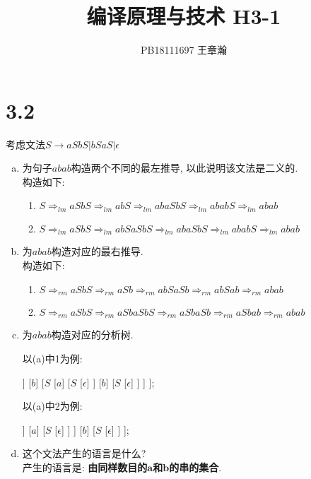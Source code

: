 \documentclass[UTF8]{article}
\title{编译原理与技术 H3-1}
\date{}
\author{PB18111697 王章瀚}
\begin{document}
\maketitle

\section*{3.2}
\noindent 考虑文法$S\rightarrow aSbS|bSaS|\epsilon$
\begin{enumerate}[(a) ]
\item 为句子$abab$构造两个不同的最左推导, 以此说明该文法是二义的.\\
	构造如下:
	\begin{enumerate}[1. ]
	\item $S \Rightarrow_{lm} aSbS \Rightarrow_{lm} abS \Rightarrow_{lm} abaSbS \Rightarrow_{lm} ababS \Rightarrow_{lm} abab$
	\item $S \Rightarrow_{lm} aSbS \Rightarrow_{lm} abSaSbS \Rightarrow_{lm} abaSbS \Rightarrow_{lm} ababS \Rightarrow_{lm} abab$
	\end{enumerate}
\item 为$abab$构造对应的最右推导.\\
	构造如下:
	\begin{enumerate}[1. ]
	\item $S \Rightarrow_{rm} aSbS \Rightarrow_{rm} aSb \Rightarrow_{rm} abSaSb \Rightarrow_{rm} abSab \Rightarrow_{rm} abab$
	\item $S \Rightarrow_{rm} aSbS \Rightarrow_{rm} aSbaSbS \Rightarrow_{rm} aSbaSb \Rightarrow_{rm} aSbab \Rightarrow_{rm} abab$
	\end{enumerate}
\item 为$abab$构造对应的分析树.\\
	\begin{minipage}{0.5\linewidth}
	以(a)中1为例:\\
	\begin{forest}
	[$S$, for tree={fill=aquamarine}
		[$a$]
		[$S$
			[$\epsilon$]
		]
		[$b$]
		[$S$
			[$a$]
			[$S$
				[$\epsilon$]
			]
			[$b$]
			[$S$
				[$\epsilon$]
			]
		]
	];
	\end{forest}
	\end{minipage}
	\begin{minipage}{0.5\linewidth}
	以(a)中2为例:\\
	\begin{forest}
	[$S$, for tree={fill=aquamarine}
		[$a$]
		[$S$
			[$b$]
			[$S$
				[$\epsilon$]
			]
			[$a$]
			[$S$
				[$\epsilon$]
			]
		]
		[$b$]
		[$S$
			[$\epsilon$]
		]
	];
	\end{forest}
	\end{minipage}
\item 这个文法产生的语言是什么?\\
	产生的语言是: \textbf{由同样数目的$\bm{a}$和$\bm{b}$的串的集合}.
\end{enumerate}
\end{document}
